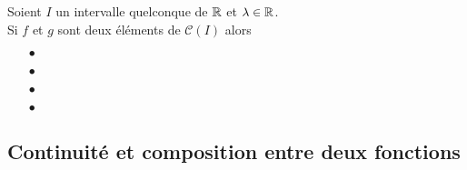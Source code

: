\documentclass[a4paper, 11pt]{article}
\begin{document}
\begin{prop}
	Soient $I$ un intervalle quelconque de $\mathbb{R}$ et $\lambda\in\mathbb{R}$.\\
	\noindent Si $f$ et $g$ sont deux \'el\'ements de $\mathcal{C}(I)$ alors\vsec
	\begin{itemize}
		\item[$\bullet$] \dotfill \vsec
		\item[$\bullet$]  \dotfill\vsec
		\item[$\bullet$]  \dotfill \vsec
		\item[$\bullet$]  \dotfill \vsec
	\end{itemize}
\end{prop}



\subsection{Continuit\'e et composition entre deux fonctions}
\end{document}
